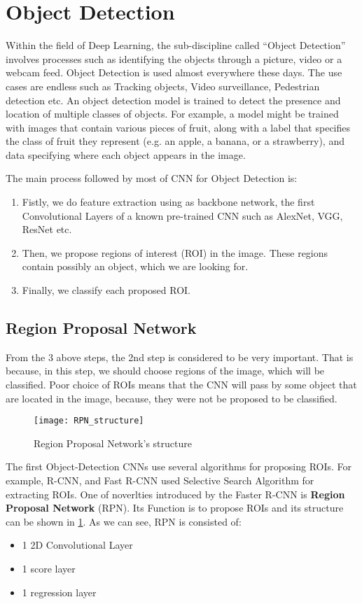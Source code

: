 \section{Object Detection}
Within the field of Deep Learning, the sub-discipline called “Object Detection” involves processes such as identifying the objects through a picture, video or a webcam feed.
Object Detection is used almost everywhere these days. The use cases are endless such as Tracking objects, Video surveillance, Pedestrian detection etc. 
An object detection model is trained to detect the presence and location of multiple classes of objects. For example, a model might be trained with images that
contain various pieces of fruit, along with a label that specifies the class of fruit they represent (e.g. an apple, a banana, or a strawberry),
and data specifying where each object appears in the image.

The main process followed by most of CNN for Object Detection is:
\begin{enumerate}
\item Fistly, we do feature extraction using as backbone network, the first Convolutional Layers of a known pre-trained CNN such
  as AlexNet, VGG, ResNet etc.
\item Then, we propose regions of interest (ROI) in the image. These regions contain possibly an object, which we are looking for.
\item Finally, we classify each proposed ROI.
\end{enumerate}

\subsection{ Region Proposal Network}

From the 3 above steps, the 2nd step is considered to be very important. That is because, in this step, we should choose regions of
the image, which will be classified. Poor choice of ROIs means that the CNN will pass by some object that are located in the image,
because, they were not be proposed to be classified.

\begin{figure}[h]
  \centering
  \texttt{[image: RPN\_structure]}
  \caption{ Region Proposal Network's structure}
  \label{fig:rpn_structure}
\end{figure}

The first Object-Detection CNNs use several algorithms for proposing ROIs. For example, R-CNN\cite{DBLP:journals/corr/GirshickDDM13},
and Fast R-CNN\cite{Girshick:2015:FR:2919332.2920125} used Selective Search Algorithm for extracting ROIs.
One of noverlties introduced by the Faster R-CNN\cite{Ren:2015:FRT:2969239.2969250} is \textbf{Region Proposal Network} (RPN). Its
Function is to propose ROIs and its structure can be shown in \ref{fig:rpn_structure}. As we can see, RPN is consisted of:
\begin{itemize}
\item 1 2D Convolutional Layer
\item 1 score layer 
\item 1 regression layer
\end{itemize}


